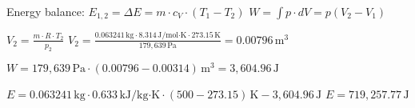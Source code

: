 Energy balance:  
\( E_{1,2} = \Delta E = m \cdot c_V \cdot (T_1 - T_2) \)  
\( W = \int p \cdot dV = p(V_2 - V_1) \)  

\( V_2 = \frac{m \cdot R \cdot T_2}{p_2} \)  
\( V_2 = \frac{0.063241 \, \text{kg} \cdot 8.314 \, \text{J/mol·K} \cdot 273.15 \, \text{K}}{179,639 \, \text{Pa}} = 0.00796 \, \text{m}^3 \)  

\( W = 179,639 \, \text{Pa} \cdot (0.00796 - 0.00314) \, \text{m}^3 = 3,604.96 \, \text{J} \)  

\( E = 0.063241 \, \text{kg} \cdot 0.633 \, \text{kJ/kg·K} \cdot (500 - 273.15) \, \text{K} - 3,604.96 \, \text{J} \)  
\( E = 719,257.77 \, \text{J} \)